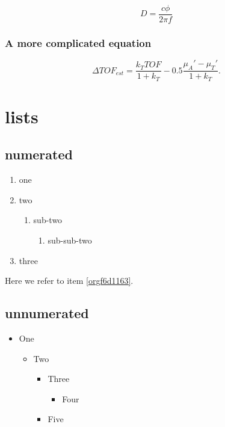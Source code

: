 \begin{equation}
\label{eq:orgcfcb712}
D = \frac{c\phi}{2\pi f}
\end{equation}

\subsubsection{A more complicated equation}
\label{sec:orgaae4d4c}

\begin{equation}
\Delta TOF_{est} = \frac{k_T TOF}{1+k_T } - 0.5 \frac{\mu_A' - \mu_T'}{1+k_T}.
\end{equation}

\section{lists}
\label{sec:org23015dc}
\subsection{numerated}
\label{sec:orgf49db86}
\begin{enumerate}
\item one
\item two
\begin{enumerate}
\item sub-two
\begin{enumerate}
\item sub-sub-two
\end{enumerate}
\end{enumerate}
\item \label{orgf6d1163}three
\end{enumerate}

Here we refer to item \ref{orgf6d1163}.

\subsection{unnumerated}
\label{sec:org3189b12}
\begin{itemize}
\item One
\begin{itemize}
\item Two
\begin{itemize}
\item Three
\begin{itemize}
\item Four
\end{itemize}
\item Five
\end{itemize}
\end{itemize}
\end{itemize}

